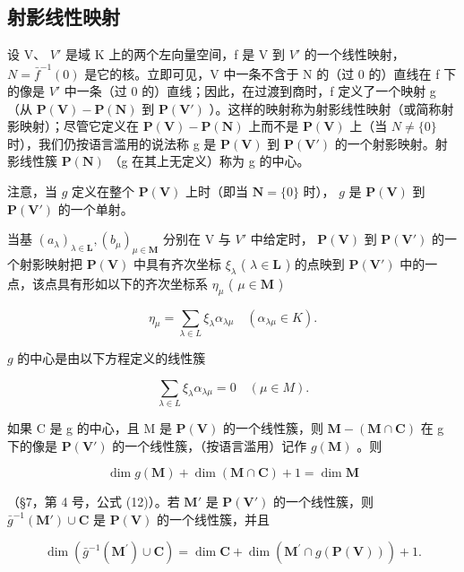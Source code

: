 \subsection{射影线性映射}

设 V、 \(V'\) 是域 K 上的两个左向量空间，f 是 V 到 \(V'\) 的一个线性映射， \(N = \bar{f}^{-1}(0)\) 是它的核。立即可见，V 中一条不含于 N 的（过 0 的）直线在 f 下的像是 \(V'\) 中一条（过 0 的）直线；因此，在过渡到商时，f 定义了一个映射 g （从 \(\mathbf{P}(\mathbf{V}) - \mathbf{P}(\mathbf{N})\) 到 \(\mathbf{P}(\mathbf{V}')\) ）。这样的映射称为射影线性映射（或简称射影映射）；尽管它定义在 \(\mathbf{P}(\mathbf{V}) - \mathbf{P}(\mathbf{N})\) 上而不是 \(\mathbf{P}(\mathbf{V})\) 上（当 \(N \neq \{0\}\) 时），我们仍按语言滥用的说法称 g 是 \(\mathbf{P}(\mathbf{V})\) 到 \(\mathbf{P}(\mathbf{V}')\) 的一个射影映射。射影线性簇 \(\mathbf{P}(\mathbf{N})\) （g 在其上无定义）称为 g 的中心。

注意，当 \(g\) 定义在整个 \(\mathbf{P}(\mathbf{V})\) 上时（即当 \(\mathbf{N} = \{0\}\) 时）， \(g\) 是 \(\mathbf{P}(\mathbf{V})\) 到 \(\mathbf{P}(\mathbf{V}')\) 的一个单射。

当基 \((a_{\lambda})_{\lambda\in\mathbf{L}}, (b_{\mu})_{\mu\in\mathbf{M}}\) 分别在 V 与 \(V'\) 中给定时， \(\mathbf{P}(\mathbf{V})\) 到 \(\mathbf{P}(\mathbf{V}')\) 的一个射影映射把 \(\mathbf{P}(\mathbf{V})\) 中具有齐次坐标 \(\xi_{\lambda}\) ( \(\lambda \in \mathbf{L}\) ) 的点映到 \(\mathbf{P}(\mathbf{V}')\) 中的一点，该点具有形如以下的齐次坐标系 \(\eta_{\mu}\) ( \(\mu \in \mathbf{M}\) )

\[
\eta_ {\mu} = \sum_ {\lambda \in L} \xi_ {\lambda} \alpha_ {\lambda \mu} \quad (\alpha_ {\lambda \mu} \in K).\tag{6}
\]

 \(g\) 的中心是由以下方程定义的线性簇

\[
\sum_ {\lambda \in L} \xi_ {\lambda} \alpha_ {\lambda \mu} = 0 \quad (\mu \in M).
\]

如果 C 是 g 的中心，且 M 是 \(\mathbf{P}(\mathbf{V})\) 的一个线性簇，则 \(\mathbf{M} - (\mathbf{M} \cap \mathbf{C})\) 在 g 下的像是 \(\mathbf{P}(\mathbf{V}')\) 的一个线性簇，（按语言滥用）记作 \(g(\mathbf{M})\) 。则

\[
\dim g (\mathbf {M}) + \dim (\mathbf {M} \cap \mathbf {C}) + 1 = \dim \mathbf {M}\tag{7}
\]

（§7，第 4 号，公式 (12)）。若 \(\mathbf{M}'\) 是 \(\mathbf{P}(\mathbf{V}')\) 的一个线性簇，则 \(\bar{g}^{-1}(\mathbf{M}') \cup \mathbf{C}\) 是 \(\mathbf{P}(\mathbf{V})\) 的一个线性簇，并且

\[
\dim (\bar {g} ^ {- 1} (\mathbf {M} ^ {\prime}) \cup \mathbf {C}) = \dim \mathbf {C} + \dim (\mathbf {M} ^ {\prime} \cap g (\mathbf {P} (\mathbf {V}))) + 1.\tag{8}
\]

